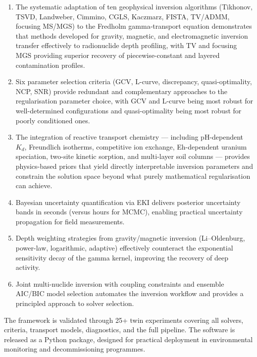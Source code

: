 \documentclass[a4paper,11pt]{article}
\begin{document}
\begin{enumerate}
  \item The systematic adaptation of ten geophysical inversion algorithms
  (Tikhonov, TSVD, Landweber, Cimmino, CGLS, Kaczmarz, FISTA, TV/ADMM,
  focusing MS/MGS) to the Fredholm gamma-transport equation
  demonstrates that methods developed for gravity, magnetic, and
  electromagnetic inversion transfer effectively to radionuclide
  depth profiling, with TV and focusing MGS providing superior
  recovery of piecewise-constant and layered contamination profiles.

  \item Six parameter selection criteria (GCV, L-curve, discrepancy,
  quasi-optimality, NCP, SNR) provide redundant and complementary
  approaches to the regularisation parameter choice, with GCV and
  L-curve being most robust for well-determined configurations and
  quasi-optimality being most robust for poorly conditioned ones.

  \item The integration of reactive transport chemistry --- including
  pH-dependent $K_d$, Freundlich isotherms, competitive ion exchange,
  Eh-dependent uranium speciation, two-site kinetic sorption, and
  multi-layer soil columns --- provides physics-based priors that
  yield directly interpretable inversion parameters and constrain
  the solution space beyond what purely mathematical regularisation
  can achieve.

  \item Bayesian uncertainty quantification via EKI delivers posterior
  uncertainty bands in seconds (versus hours for MCMC), enabling
  practical uncertainty propagation for field measurements.

  \item Depth weighting strategies from gravity/magnetic inversion
  (Li--Oldenburg, power-law, logarithmic, adaptive) effectively
  counteract the exponential sensitivity decay of the gamma kernel,
  improving the recovery of deep activity.

  \item Joint multi-nuclide inversion with coupling constraints and
  ensemble AIC/BIC model selection automates the inversion workflow
  and provides a principled approach to solver selection.
\end{enumerate}

The framework is validated through 25+ twin experiments covering all
solvers, criteria, transport models, diagnostics, and the full
pipeline.  The software is released as a Python package, designed for
practical deployment in environmental monitoring and decommissioning
programmes.
\end{document}
